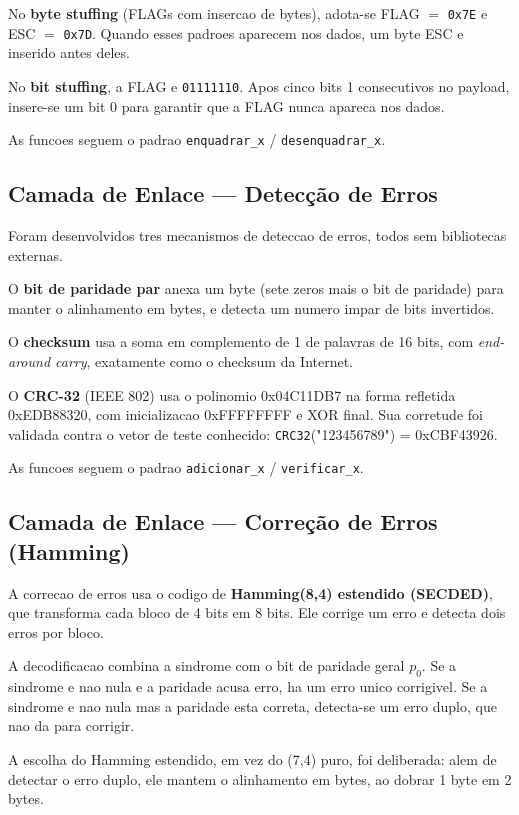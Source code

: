 \documentclass[12pt,a4paper]{article}
\begin{document}
No \textbf{byte stuffing} (FLAGs com insercao de bytes), adota-se FLAG $=$ \texttt{0x7E} e ESC $=$ \texttt{0x7D}. Quando esses padroes aparecem nos dados, um byte ESC e inserido antes deles.

No \textbf{bit stuffing}, a FLAG e \texttt{01111110}. Apos cinco bits 1 consecutivos no payload, insere-se um bit 0 para garantir que a FLAG nunca apareca nos dados.

As funcoes seguem o padrao \texttt{enquadrar\_x} / \texttt{desenquadrar\_x}.

\subsection{Camada de Enlace --- Detecção de Erros}

Foram desenvolvidos tres mecanismos de deteccao de erros, todos sem bibliotecas externas.

O \textbf{bit de paridade par} anexa um byte (sete zeros mais o bit de paridade) para manter o alinhamento em bytes, e detecta um numero impar de bits invertidos.

O \textbf{checksum} usa a soma em complemento de 1 de palavras de 16 bits, com \textit{end-around carry}, exatamente como o checksum da Internet.

O \textbf{CRC-32} (IEEE 802) usa o polinomio 0x04C11DB7 na forma refletida 0xEDB88320, com inicializacao 0xFFFFFFFF e XOR final. Sua corretude foi validada contra o vetor de teste conhecido: \texttt{CRC32}("123456789") = 0xCBF43926.

As funcoes seguem o padrao \texttt{adicionar\_x} / \texttt{verificar\_x}.

\subsection{Camada de Enlace --- Correção de Erros (Hamming)}

A correcao de erros usa o codigo de \textbf{Hamming(8,4) estendido (SECDED)}, que transforma cada bloco de 4 bits em 8 bits. Ele corrige um erro e detecta dois erros por bloco.

A decodificacao combina a sindrome com o bit de paridade geral $p_0$. Se a sindrome e nao nula e a paridade acusa erro, ha um erro unico corrigivel. Se a sindrome e nao nula mas a paridade esta correta, detecta-se um erro duplo, que nao da para corrigir.

A escolha do Hamming estendido, em vez do (7,4) puro, foi deliberada: alem de detectar o erro duplo, ele mantem o alinhamento em bytes, ao dobrar 1 byte em 2 bytes.
\end{document}
